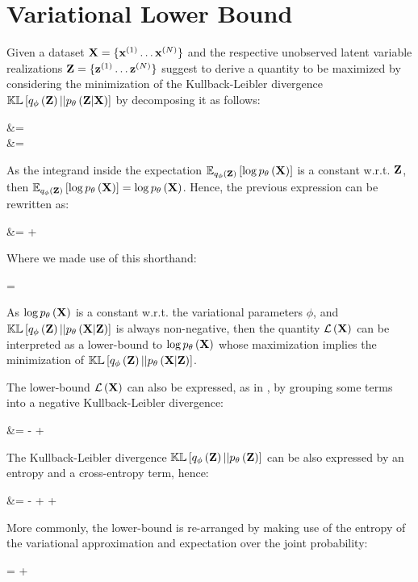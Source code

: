 \section{Variational Lower Bound}

Given a 
dataset $\mathbf{X} = \{\mathbf{x}^{(1)} \ldots \mathbf{x}^{(N)} \}$
and the respective unobserved latent variable realizations
$\mathbf{Z} = \{\mathbf{z}^{(1)} \ldots \mathbf{z}^{(N)}\}$
\cite{Fox2012}
suggest to derive a quantity to be maximized by considering the minimization
of the Kullback-Leibler divergence $\mathbb{KL}\left[ q_\phi\left(\mathbf{Z}\right) || p_\theta\left(\mathbf{Z}|\mathbf{X}\right) \right]$ by decomposing it as follows:

\begin{nalign}
\kl{\qphiZ}{\pZcond} &=
\expectqphiZ{\log \frac{\qphiZ}{\pZcond}}\\
&= \expectqphiZ{\log \qphiZ - \log \pXcond - \log \pZ + \log \pX}
\end{nalign}

As the integrand inside the expectation $\mathbb{E}_{q_\phi\left(\mathbf{Z}\right)}\left[ \log p_\theta\left(\mathbf{X}\right) \right]$ 
is a constant w.r.t. $\mathbf{Z}$, then $\mathbb{E}_{q_\phi\left(\mathbf{Z}\right)}\left[ \log p_\theta\left(\mathbf{X}\right) \right]=\log p_\theta\left(\mathbf{X}\right)$. Hence, the
previous expression can be rewritten as:

\begin{nalign}
\log \pX &= \kl{\qphiZ}{\pXcond}
+ \elboX
\end{nalign}

Where we made use of this shorthand:
\begin{nalign}
    \elboX = \expectqphiZ{-\log \qphiZ + \log \pXcond + \log \pZ}
\end{nalign}

As $\log p_\theta\left(\mathbf{X}\right)$ is a constant w.r.t. the variational parameters $\phi$,
and $\mathbb{KL}\left[ q_\phi\left(\mathbf{Z}\right) || p_\theta\left(\mathbf{X}|\mathbf{Z}\right) \right]$ is always non-negative,
then the quantity $\mathcal{L}\left(\mathbf{X}\right)$ can be interpreted as a lower-bound to $\log p_\theta\left(\mathbf{X}\right)$
whose maximization implies the minimization of $\mathbb{KL}\left[ q_\phi\left(\mathbf{Z}\right) || p_\theta\left(\mathbf{X}|\mathbf{Z}\right) \right]$.

The lower-bound $\mathcal{L}\left(\mathbf{X}\right)$ can also be expressed, as in \cite{1312.6114},
by grouping some terms
into a negative Kullback-Leibler divergence:
\begin{nalign}
\elboX 
&= -\kl{\qphiZ}{\pZ} + \expectqphiZ{\log \pXcond}
\end{nalign}

The Kullback-Leibler divergence $\mathbb{KL}\left[ q_\phi\left(\mathbf{Z}\right) || p_\theta\left(\mathbf{Z}\right) \right]$ can be also expressed by 
an entropy and a cross-entropy term, hence:

\begin{nalign}\label{elbo_crossentropy}
\elboX 
&= -\entropy{\qphiZ,\pZ} + \entropy{\qphiZ} + \expectqphiZ{\log \pXcond}
\end{nalign}

More commonly, the lower-bound is re-arranged by making use of
the entropy of the variational approximation
and expectation over the joint probability:

\begin{nalign}
\elboX = \entropy{\qphiZ} + \expectqphiZ{\log \pXZ}
\end{nalign}



